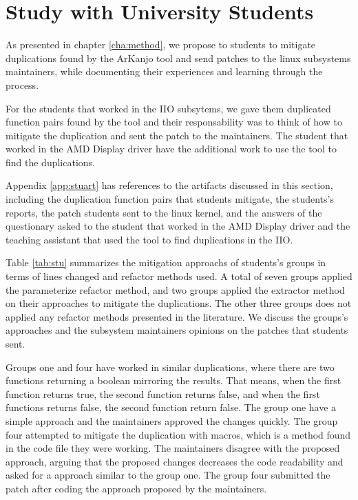 \section{Study with University Students}

As presented in chapter \ref{cha:method}, we propose to students to mitigate duplications
found by the ArKanjo tool and send patches to the linux subsystems maintainers, while
documenting their experiences and learning through the process. 

For the students that worked
in the IIO subsytems, we gave them duplicated function pairs found by the tool and their 
responsability was to think of how to mitigate the duplication and sent the patch to the 
maintainers. The student that worked in the AMD Display driver have the additional work
to use the tool to find the duplications.

Appendix \ref{app:stuart} has references
to the artifacts discussed in this section, including the duplication function pairs that students 
mitigate, the students's reports, the patch students sent to the linux kernel, and the 
answers of the questionary asked to the student that worked in the AMD Display driver and the 
teaching assistant that used the tool to find duplications in the IIO.



Table \ref{tab:stu} summarizes the mitigation approachs of students's groups in terms 
of lines changed and refactor methods used. A total of seven groups applied the parameterize refactor method,
and two groups applied the extractor method on their approaches to mitigate the duplications. 
The other three groups does not applied any refactor methods presented in the literature. 
We discuss the groups's approaches and the subsystem maintainers opinions on the patches that students
sent.

Groups one and four have worked in similar duplications, where there are two functions returning a boolean mirroring
the results. That means, when the first function returns true, the second function returns false, and when the first
functions returns false, the second function return false. The group one have a simple approach and the maintainers 
approved the changes quickly. The group four attempted to mitigate the duplication with macros, which is a method 
found in the code file they were working. The maintainers disagree with the proposed approach, arguing 
that the proposed changes decreases the code readability and asked for a approach similar to the group one. 
The group four submitted the patch after coding the approach proposed by the maintainers.

